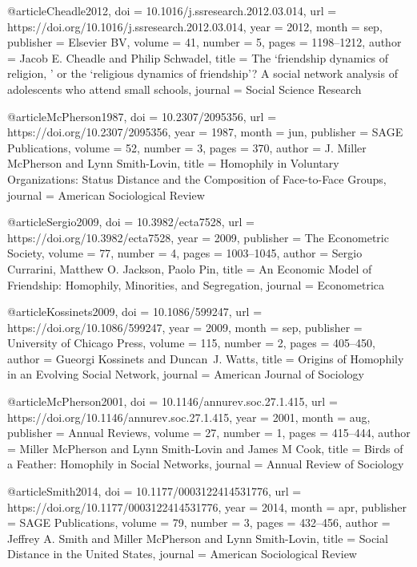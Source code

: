 @article{Cheadle2012,
  doi = {10.1016/j.ssresearch.2012.03.014},
  url = {https://doi.org/10.1016/j.ssresearch.2012.03.014},
  year = {2012},
  month = sep,
  publisher = {Elsevier {BV}},
  volume = {41},
  number = {5},
  pages = {1198--1212},
  author = {Jacob E. Cheadle and Philip Schwadel},
  title = {The `friendship dynamics of religion, ' or the `religious dynamics of friendship'? A social network analysis of adolescents who attend small schools},
  journal = {Social Science Research}
}

@article{McPherson1987,
  doi = {10.2307/2095356},
  url = {https://doi.org/10.2307/2095356},
  year = {1987},
  month = jun,
  publisher = {{SAGE} Publications},
  volume = {52},
  number = {3},
  pages = {370},
  author = {J. Miller McPherson and Lynn Smith-Lovin},
  title = {Homophily in Voluntary Organizations: Status Distance and the Composition of Face-to-Face Groups},
  journal = {American Sociological Review}
}

@article{Sergio2009,
  doi = {10.3982/ecta7528},
  url = {https://doi.org/10.3982/ecta7528},
  year = {2009},
  publisher = {The Econometric Society},
  volume = {77},
  number = {4},
  pages = {1003--1045},
  author = {Sergio Currarini, Matthew O. Jackson, Paolo Pin},
  title = {An Economic Model of Friendship: Homophily,  Minorities,  and Segregation},
  journal = {Econometrica}
}

@article{Kossinets2009,
  doi = {10.1086/599247},
  url = {https://doi.org/10.1086/599247},
  year = {2009},
  month = sep,
  publisher = {University of Chicago Press},
  volume = {115},
  number = {2},
  pages = {405--450},
  author = {Gueorgi Kossinets and Duncan~J. Watts},
  title = {Origins of Homophily in an Evolving Social Network},
  journal = {American Journal of Sociology}
}

@article{McPherson2001,
  doi = {10.1146/annurev.soc.27.1.415},
  url = {https://doi.org/10.1146/annurev.soc.27.1.415},
  year = {2001},
  month = aug,
  publisher = {Annual Reviews},
  volume = {27},
  number = {1},
  pages = {415--444},
  author = {Miller McPherson and Lynn Smith-Lovin and James M Cook},
  title = {Birds of a Feather: Homophily in Social Networks},
  journal = {Annual Review of Sociology}
}

@article{Smith2014,
  doi = {10.1177/0003122414531776},
  url = {https://doi.org/10.1177/0003122414531776},
  year = {2014},
  month = apr,
  publisher = {{SAGE} Publications},
  volume = {79},
  number = {3},
  pages = {432--456},
  author = {Jeffrey A. Smith and Miller McPherson and Lynn Smith-Lovin},
  title = {Social Distance in the United States},
  journal = {American Sociological Review}
}

